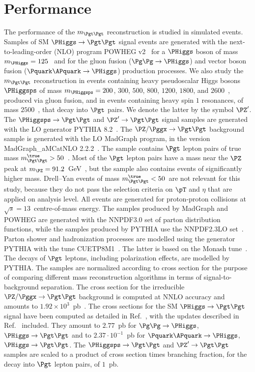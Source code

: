 \section{Performance}
\label{sec:performance}

The performance of the $m_{\Pgt\Pgt}$ reconstruction is studied in simulated events.
Samples of SM $\PHiggs \to \Pgt\Pgt$ signal events
are generated with the next-to-leading-order (NLO) program POWHEG v2~\cite{POWHEG1,POWHEG2,POWHEG3}
for a $\PHiggs$ boson of mass $m_{\PHiggs} = 125$~\GeV 
and for the gluon fusion ($\Pg\Pg \to \PHiggs$) and vector boson fusion ($\Pquark\APquark \to \PHiggs$) production processes.
We also study the $m_{\Pgt\Pgt}$ reconstruction in events containing
heavy pseudoscalar Higgs bosons $\PHiggsps$ of mass $m_{\PHiggsps} = 200$, $300$, $500$, $800$, $1200$, $1800$, and $2600$~\GeV,
produced via gluon fusion, and in events containing heavy spin $1$
resonances, of mass $2500$~\GeV, that decay into $\Pgt$ pairs.
We denote the latter by the symbol $\PZ'$. 
The $\PHiggsps \to \Pgt\Pgt$ and $\PZ' \to \Pgt\Pgt$ signal samples are generated with the LO generator PYTHIA 8.2~\cite{pythia8}.
The $\PZ/\Pggx \to \Pgt\Pgt$ background sample is generated with the LO MadGraph program, in the version MadGraph\_aMCatNLO 2.2.2~\cite{MadGraph_aMCatNLO}.
The sample contains $\Pgt$ lepton pairs of true mass $m_{\Pgt\Pgt}^{\true} > 50$~\GeV.
Most of the $\Pgt$ lepton pairs have a mass near the $\PZ$ peak at $m_{\PZ} = 91.2$~GeV~\cite{PDG}, 
but the sample also contains events of significantly higher mass.
Drell--Yan events of mass $m_{\Pgt\Pgt}^{\true} < 50$~\GeV are not relevant for this study, 
because they do not pass the selection criteria on $\pT$ and $\eta$ that are applied on analysis level.
All events are generated for proton-proton collisions at $\sqrt{s} = 13$~\TeV centre-of-mass energy.
The samples produced by MadGraph and POWHEG are generated with the NNPDF3.0 set of parton distribution functions,
while the samples produced by PYTHIA use the NNPDF2.3LO set~\cite{NNPDF1,NNPDF2,NNPDF3}.
Parton shower and hadronization processes are modelled using the generator PYTHIA with the tune CUETP8M1~\cite{PYTHIA_CUETP8M1tune_CMS}.
The latter is based on the Monash tune~\cite{PYTHIA_MonashTune}.
The decays of $\Pgt$ leptons, including polarization effects, are modelled by PYTHIA.
The samples are normalized according to cross section for the purpose of comparing different mass reconstruction algorithms in terms of signal-to-background separation.
The cross section for the irreducible $\PZ/\Pggx \to \Pgt\Pgt$ background is computed at NNLO accuracy and amounts to $1.92 \times 10^{3}$~pb~\cite{FEWZ}.
The cross sections for the SM $\PHiggs \to \Pgt\Pgt$ signal have been computed as detailed in Ref.~\cite{Dittmaier:2011ti},
with the updates described in Ref.~\cite{Heinemeyer:2013tqa} included.
They amount to $2.77$~pb for $\Pg\Pg \to \PHiggs$, $\PHiggs \to \Pgt\Pgt$ and to $2.37 \cdot 10^{-1}$~pb for $\Pquark\APquark \to \PHiggs$, $\PHiggs \to \Pgt\Pgt$.
The $\PHiggsps \to \Pgt\Pgt$ and $\PZ' \to \Pgt\Pgt$ samples 
are scaled to a product of cross section times branching fraction, for the decay into $\Pgt$ lepton pairs, of $1$~pb.

